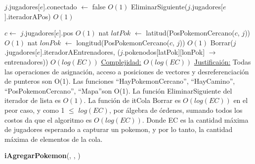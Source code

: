 \begin{Algoritmos}
\begin{algorithm}[H]
\begin{algorithmic}[1]
\State $j$.jugadores[$e$].conectado $\gets$ false \Comment $O(1)$
\State EliminarSiguiente($j$.jugadores[$e$].iteradorAPos) \Comment $O(1)$


\State $c \gets$ $j$.jugadores[$e$].pos 
 \Comment $O(1)$
    \State nat $latPok$ $\gets$ latitud(PosPokemonCercano($c$, $j$)) \Comment $O(1)$
    \State nat $lonPok$ $\gets$ longitud(PosPokemonCercano($c$, $j$)) \Comment $O(1)$
    \State Borrar($j$.jugadores[$e$].iteradorAEntrenadores, ($j$.pokenodos[latPok][lonPok] $\rightarrow$ entrenadores)) \Comment $O(log(EC))$
\EndIf
\medskip
\State \underline{Complejidad:} $O(log(EC))$ 
\State \underline{Justificai\'on:} Todas las operaciones de asignaci\'on, acceso a posiciones de vectores y desreferenciaci\'on de punteros son O(1). Las funciones ``HayPokemonCercano'', ``HayCamino'', ``PosPokemonCercano'', ``Mapa''\hspace{0.5mm}son O(1). La funci\'on EliminarSiguiente del iterador de lista es $O(1)$. La funci\'on de itCola Borrar es $O(log(EC))$ en el peor caso, y como 1 $\leq$ $log(EC)$, por \'algebra de \'ordenes, sumando todos los costos da que el algoritmo es $O(log(EC))$. Donde EC es la cantidad m\'axima de jugadores esperando a capturar un pokemon, y por lo tanto, la cantidad m\'axima de elementos de la cola.


\end{algorithmic}
\end{algorithm}


\begin{algorithm}[H]
{\textbf{iAgregarPokemon}(, , )}
\begin{algorithmic}[1]


\end{algorithmic}
\end{algorithm}
\end{Algoritmos}
